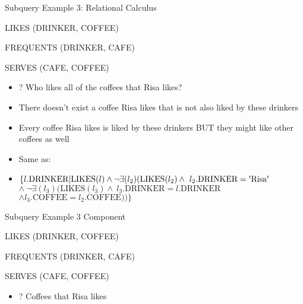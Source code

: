 \documentclass[aspectratio=169]{beamer}
\newenvironment{noindentitemize}
{ \begin{itemize}
 \setlength{\itemsep}{1.5ex}
  \setlength{\parsep}{0pt}   
  \setlength{\parskip}{0pt}
 \addtolength{\leftskip}{-2em}
 }
{ \end{itemize} }
\newcommand{\LIKES}{\textrm{LIKES}}
\newcommand{\COFFEE}{\textrm{COFFEE}}
\newcommand{\DRINKER}{\textrm{DRINKER}}
\begin{document}
\begin{frame}[fragile]{Subquery Example 3: Relational Calculus}

LIKES (DRINKER, COFFEE)

FREQUENTS (DRINKER, CAFE)

SERVES (CAFE, COFFEE)


\begin{noindentitemize}
\item[?] Who likes all of the coffees that Risa likes?
\item There doesn't exist a coffee Risa likes that is not also liked by these drinkers
\item Every coffee Risa likes is liked by these drinkers BUT they might like other coffees as well
\end{noindentitemize}



\begin{noindentitemize}
\item Same as:
	\item[] $\{l.\DRINKER | \LIKES(l) \wedge \neg \exists(l_2)(\LIKES(l_2) \wedge\ 
	   l_2.\DRINKER = \textrm{\textquotesingle{Risa}\textquotesingle}$\\

           \hspace{2em}$\wedge\ \neg \exists(l_3)(\LIKES(l_3) \wedge\
		l_3.\DRINKER = l.\DRINKER $\\
	\hspace{2em}$\wedge l_3.\COFFEE = l_2.\COFFEE))\}$
\end{noindentitemize}
\end{frame}


\begin{frame}[fragile]{Subquery Example 3 Component}

LIKES (DRINKER, COFFEE)

FREQUENTS (DRINKER, CAFE)

SERVES (CAFE, COFFEE)


\begin{noindentitemize}
\item[?] Coffees that Risa likes
\end{noindentitemize}
\end{frame}
\end{document}
